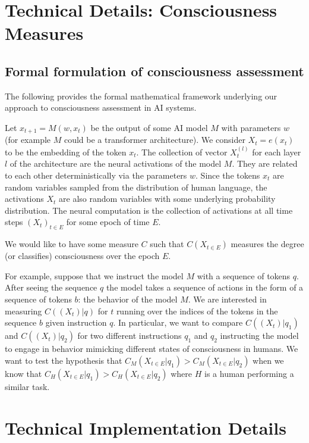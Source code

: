 \documentclass[11pt,a4paper]{article}
\begin{document}
\appendix

\section{Technical Details: Consciousness Measures}

\subsection{Formal formulation of consciousness assessment}

The following provides the formal mathematical framework underlying our approach to consciousness assessment in AI systems.

Let $x_{t+1} = M(w, x_t)$ be the output of some AI model $M$ with parameters $w$ (for example $M$ could be a transformer architecture). We consider $X_t = e(x_t)$ to be the embedding of the token $x_t$. The collection of vector $X^{(l)}_t$ for each layer $l$ of the architecture are the neural activations of the model $M$. They are related to each other deterministically via the parameters $w$. Since the tokens $x_t$ are random variables sampled from the distribution of human language, the activations $X_t$ are also random variables with some underlying probability distribution. The neural computation is the collection of activations at all time steps $(X_t)_{t\in E}$ for some epoch of time $E$.

We would like to have some measure $C$ such that $C(X_{t\in E})$ measures the degree (or classifies) consciousness over the epoch $E$.

For example, suppose that we instruct the model $M$ with a sequence of tokens $q$. After seeing the sequence $q$ the model takes a sequence of actions in the form of a sequence of tokens $b$: the behavior of the model $M$. We are interested in measuring $C((X_t)|q)$ for $t$ running over the indices of the tokens in the sequence $b$ given instruction $q$. In particular, we want to compare $C((X_t)|q_1)$ and $C((X_t)|q_2)$ for two different instructions $q_1$ and $q_2$ instructing the model to engage in behavior mimicking different states of consciousness in humans. We want to test the hypothesis that $C_M(X_{t\in E}|q_1) > C_M(X_{t\in E}|q_2)$ when we know that $C_H(X_{t\in E}|q_1) > C_H(X_{t\in E}|q_2)$ where $H$ is a human performing a similar task.

\section{Technical Implementation Details}
\end{document}
